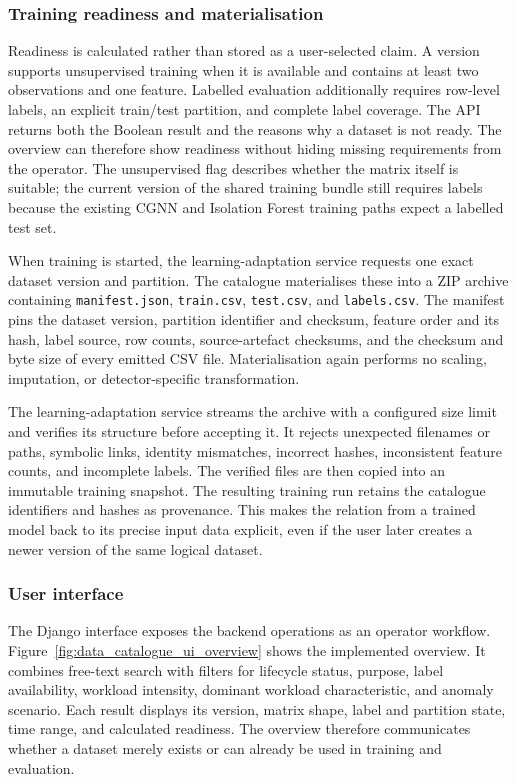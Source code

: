 \subsubsection{Training readiness and materialisation}

Readiness is calculated rather than stored as a user-selected claim. A version supports unsupervised training when it is available and contains at least two observations and one feature. Labelled evaluation additionally requires row-level labels, an explicit train/test partition, and complete label coverage. The API returns both the Boolean result and the reasons why a dataset is not ready. The overview can therefore show readiness without hiding missing requirements from the operator. The unsupervised flag describes whether the matrix itself is suitable; the current version of the shared training bundle still requires labels because the existing CGNN and Isolation Forest training paths expect a labelled test set.

When training is started, the learning-adaptation service requests one exact dataset version and partition. The catalogue materialises these into a ZIP archive containing \texttt{manifest.json}, \texttt{train.csv}, \texttt{test.csv}, and \texttt{labels.csv}. The manifest pins the dataset version, partition identifier and checksum, feature order and its hash, label source, row counts, source-artefact checksums, and the checksum and byte size of every emitted CSV file. Materialisation again performs no scaling, imputation, or detector-specific transformation.

The learning-adaptation service streams the archive with a configured size limit and verifies its structure before accepting it. It rejects unexpected filenames or paths, symbolic links, identity mismatches, incorrect hashes, inconsistent feature counts, and incomplete labels. The verified files are then copied into an immutable training snapshot. The resulting training run retains the catalogue identifiers and hashes as provenance. This makes the relation from a trained model back to its precise input data explicit, even if the user later creates a newer version of the same logical dataset.

\subsubsection{User interface}

The Django interface exposes the backend operations as an operator workflow. Figure~\ref{fig:data_catalogue_ui_overview} shows the implemented overview. It combines free-text search with filters for lifecycle status, purpose, label availability, workload intensity, dominant workload characteristic, and anomaly scenario. Each result displays its version, matrix shape, label and partition state, time range, and calculated readiness. The overview therefore communicates whether a dataset merely exists or can already be used in training and evaluation.

